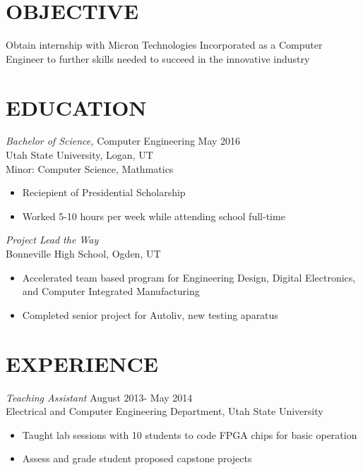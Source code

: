\documentclass[line,margin]{res}
\begin{document}
\address{sam.tanner@aggiemail.usu.edu}
\address{(801) 941-7217}

 
\begin{resume}
 
\section{OBJECTIVE}       Obtain internship with Micron Technologies Incorporated
as a Computer Engineer to further skills needed to succeed in the innovative industry\\
 
 
\section{EDUCATION} {\sl Bachelor of Science,} Computer Engineering \hfill May 2016\\
                Utah State University, Logan, UT\\
                Minor: Computer Science, Mathmatics
		\begin{itemize} \itemsep -2pt %
		\item Reciepient of Presidential Scholarship
		\item Worked 5-10 hours per week while attending school full-time
		\end{itemize}

		{\sl Project Lead the Way}\\
		Bonneville High School, Ogden, UT
		\begin{itemize} \itemsep -2pt
			\item Accelerated team based program for Engineering Design, Digital Electronics,
				and Computer Integrated Manufacturing
			\item Completed senior project for Autoliv, new testing aparatus
		\end{itemize} 
 
\section{EXPERIENCE} 
                {\sl Teaching Assistant} \hfill August 2013- May 2014 \\
                Electrical and Computer Engineering Department, Utah State University 
                 \begin{itemize}  \itemsep -2pt %
                 \item Taught lab sessions with 10 students to code FPGA chips for 
		basic operation
		\item Assess and grade student proposed capstone projects 
                 \end{itemize} 


\end{resume}
\end{document}
